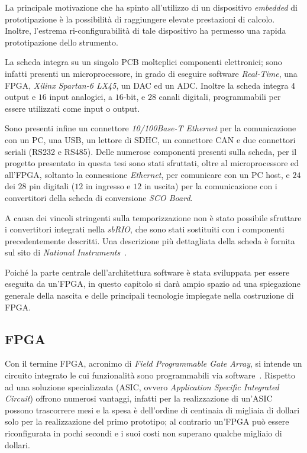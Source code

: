 La principale motivazione che ha spinto all'utilizzo di un dispositivo \textit{embedded} di prototipazione è la possibilità di raggiungere elevate prestazioni di calcolo. Inoltre, l'estrema ri-configurabilità di tale dispositivo ha permesso una rapida prototipazione dello strumento.

La scheda integra su un singolo PCB molteplici componenti elettronici; sono infatti presenti un microprocessore, in grado di eseguire software \textit{Real-Time}, una FPGA, \textit{Xilinx Spartan-6 LX45}, un DAC ed un ADC. Inoltre la scheda integra $4$ output e $16$ input analogici, a $16$-bit, e $28$ canali digitali, programmabili per essere utilizzati come input o output.

Sono presenti infine un connettore \textit{10/100Base-T Ethernet} per la comunicazione con un PC, una USB, un lettore di SDHC, un connettore CAN e due connettori seriali (RS232 e RS485). Delle numerose componenti presenti sulla scheda, per il progetto presentato in questa tesi sono stati sfruttati, oltre al microprocessore ed all'FPGA, soltanto la connessione \textit{Ethernet}, per comunicare con un PC host, e $24$ dei $28$ pin digitali ($12$ in ingresso e $12$ in uscita) per la comunicazione con i convertitori della scheda di conversione \textit{SCO Board}.

A causa dei vincoli stringenti sulla temporizzazione non è stato possibile sfruttare i convertitori integrati nella \textit{sbRIO}, che sono stati sostituiti con i componenti precedentemente descritti. Una descrizione più dettagliata della scheda è fornita sul sito di \textit{National Instruments}~\cite{sitesbrio}.

Poiché la parte centrale dell'architettura software è stata sviluppata per essere eseguita da un'FPGA, in questo capitolo si darà ampio spazio ad una spiegazione generale della nascita e delle principali tecnologie impiegate nella costruzione di FPGA.

\subsection{FPGA}
Con il termine FPGA, acronimo di \textit{Field Programmable Gate Array}, si intende un circuito integrato le cui funzionalità sono programmabili via software~\cite{Kuon:2008:FAS:1454695.1454696}. Rispetto ad una soluzione specializzata (ASIC, ovvero \textit{Application Specific Integrated Circuit}) offrono numerosi vantaggi, infatti per la realizzazione di un'ASIC possono trascorrere mesi e la spesa è dell'ordine di centinaia di migliaia di dollari solo per la realizzazione del primo prototipo; al contrario un'FPGA può essere riconfigurata in pochi secondi e i suoi costi non superano qualche migliaio di dollari.


